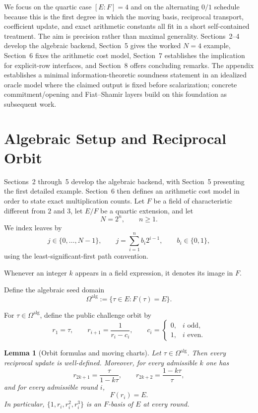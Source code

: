 \documentclass[11pt]{article}
\newtheorem{lemma}[theorem]{Lemma}
\begin{document}
We focus on the quartic case \([E:F]=4\) and on the alternating \(0/1\) schedule because this is the first degree in which the moving basis, reciprocal transport, coefficient update, and exact arithmetic constants all fit in a short self-contained treatment. The aim is precision rather than maximal generality. Sections~2--4 develop the algebraic backend, Section~5 gives the worked \(N=4\) example, Section~6 fixes the arithmetic cost model, Section~7 establishes the implication for explicit-row interfaces, and Section~8 offers concluding remarks. The appendix establishes a minimal information-theoretic soundness statement in an idealized oracle model where the claimed output is fixed before scalarization; concrete commitment/opening and Fiat--Shamir layers build on this foundation as subsequent work.

\section{Algebraic Setup and Reciprocal Orbit}

Sections~2 through~5 develop the algebraic backend, with Section~5 presenting the first detailed example. Section~6 then defines an arithmetic cost model in order to state exact multiplication counts. Let \(F\) be a field of characteristic different from \(2\) and \(3\), let \(E/F\) be a quartic extension, and let
\[
N=2^n,
\qquad n\ge 1.
\]
We index leaves by
\[
j\in\{0,\dots,N-1\},
\qquad
j=\sum_{i=1}^{n} b_i2^{i-1},
\qquad
b_i\in\{0,1\},
\]
using the least-significant-first path convention.

Whenever an integer \(k\) appears in a field expression, it denotes its image in \(F\).

Define the algebraic seed domain
\[
\Omega^{\mathrm{alg}}:=\{\tau\in E : F(\tau)=E\}.
\]

For \(\tau\in\Omega^{\mathrm{alg}}\), define the public challenge orbit by
\[
r_1=\tau,
\qquad
r_{i+1}=\frac{1}{r_i-c_i},
\qquad
c_i=
\begin{cases}
0,& i\text{ odd},\\
1,& i\text{ even}.
\end{cases}
\]

\begin{lemma}[Orbit formulas and moving charts]
\label{lem:orbit}
Let \(\tau\in\Omega^{\mathrm{alg}}\). Then every reciprocal update is well-defined. Moreover, for every admissible \(k\) one has
\[
r_{2k+1}=\frac{\tau}{1-k\tau},
\qquad
r_{2k+2}=\frac{1-k\tau}{\tau},
\]
and for every admissible round \(i\),
\[
F(r_i)=E.
\]
In particular, \(\{1,r_i,r_i^2,r_i^3\}\) is an \(F\)-basis of \(E\) at every round.
\end{lemma}
\end{document}
